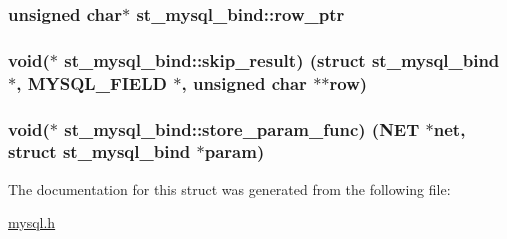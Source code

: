 \subsubsection[{row\+\_\+ptr}]{\setlength{\rightskip}{0pt plus 5cm}unsigned char$\ast$ st\+\_\+mysql\+\_\+bind\+::row\+\_\+ptr}\label{structst__mysql__bind_a78b2414892e0e1af294bbf773dce201e}
\hypertarget{structst__mysql__bind_a5d9670e2a4c8dcc91f3d6b21fbc33e75}{}
\subsubsection[{skip\+\_\+result}]{\setlength{\rightskip}{0pt plus 5cm}void($\ast$ st\+\_\+mysql\+\_\+bind\+::skip\+\_\+result) (struct {\bf st\+\_\+mysql\+\_\+bind} $\ast$, {\bf M\+Y\+S\+Q\+L\+\_\+\+F\+I\+E\+L\+D} $\ast$, unsigned char $\ast$$\ast$row)}\label{structst__mysql__bind_a5d9670e2a4c8dcc91f3d6b21fbc33e75}
\hypertarget{structst__mysql__bind_ae7494004e650d528427e906727c22337}{}
\subsubsection[{store\+\_\+param\+\_\+func}]{\setlength{\rightskip}{0pt plus 5cm}void($\ast$ st\+\_\+mysql\+\_\+bind\+::store\+\_\+param\+\_\+func) ({\bf N\+E\+T} $\ast$net, struct {\bf st\+\_\+mysql\+\_\+bind} $\ast$param)}\label{structst__mysql__bind_ae7494004e650d528427e906727c22337}


The documentation for this struct was generated from the following file\+:\begin{DoxyCompactItemize}
\item 
\hyperlink{mysql_8h}{mysql.\+h}\end{DoxyCompactItemize}
